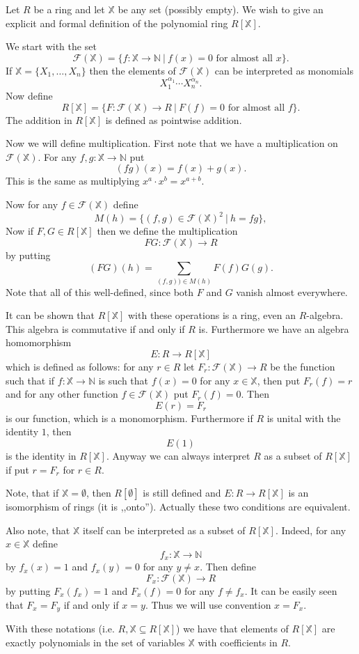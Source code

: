 \documentclass[12pt]{article}
\newcommand{\X}{\mathbb{X}}
\newcommand{\F}{\mathcal{F}}
\begin{document}
Let $R$ be a ring and let $\X$ be any set (possibly empty). We wish to give an explicit and formal definition of the polynomial ring $R[\X]$.

We start with the set 
$$\F(\X)=\{f:\X\to\mathbb{N}\ |\ f(x)=0\mbox{ for almost all }x\}.$$
If $\X=\{X_1,\ldots,X_n\}$ then the elements of $\F(\X)$ can be interpreted as monomials
$$X_1^{\alpha_1}\cdots X_n^{\alpha_n}.$$
Now define
$$R[\X]=\{F:\F(\X)\to R\ |\ F(f)=0\mbox{ for almost all }f\}.$$
The addition in $R[\X]$ is defined as pointwise addition.

Now we will define multiplication. First note that we have a multiplication on $\F(\X)$. For any $f,g:\X\to\mathbb{N}$ put
$$(fg)(x)=f(x)+g(x).$$
This is the same as multiplying $x^a\cdot x^b=x^{a+b}$.

Now for any $f\in\F(\X)$ define
$$M(h)=\{(f,g)\in\F(\X)^{2}\ |\ h=fg\},$$
Now if $F,G\in R[\X]$ then we define the multiplication
$$FG:\F(\X)\to R$$
by putting
$$(FG)(h)=\sum_{(f,g))\in M(h)}F(f)G(g).$$
Note that all of this well-defined, since both $F$ and $G$ vanish almost everywhere.

It can be shown that $R[\X]$ with these operations is a ring, even an $R$-algebra. This algebra is commutative if and only if $R$ is. Furthermore we have an algebra homomorphism
$$E:R\to R[\X]$$
which is defined as follows: for any $r\in R$ let $F_r:\F(\X)\to R$ be the function such that if $f:\X\to\mathbb{N}$ is such that $f(x)=0$ for any $x\in\X$, then put $F_r(f)=r$ and for any other function $f\in\F(\X)$ put $F_r(f)=0$. Then
$$E(r)=F_r$$
is our function, which is a monomorphism. Furthermore if $R$ is unital with the identity $1$, then
$$E(1)$$
is the identity in $R[\X]$. Anyway we can always interpret $R$ as a subset of $R[\X]$ if put $r=F_r$ for $r\in R$.

Note, that if $\X=\emptyset$, then $R[\emptyset]$ is still defined and $E:R\to R[\X]$ is an isomorphism of rings (it is ,,onto''). Actually these two conditions are equivalent.

Also note, that $\X$ itself can be interpreted as a subset of $R[\X]$. Indeed, for any $x\in\X$ define
$$f_x:\X\to\mathbb{N}$$
by $f_x(x)=1$ and $f_x(y)=0$ for any $y\neq x$. Then define
$$F_x:\F(\X)\to R$$
by putting $F_x(f_x)=1$ and $F_x(f)=0$ for any $f\neq f_x$. It can be easily seen that $F_x=F_y$ if and only if $x=y$. Thus we will use convention $x=F_x$. 

With these notations (i.e. $R,\X\subseteq R[\X]$) we have that elements of $R[\X]$ are exactly polynomials in the set of variables $\X$ with coefficients in $R$.
\end{document}
